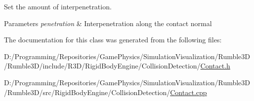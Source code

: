 Set the amount of interpenetration. 


\begin{DoxyParams}{Parameters}
{\em penetration} & Interpenetration along the contact normal \\
\hline
\end{DoxyParams}


The documentation for this class was generated from the following files\+:\begin{DoxyCompactItemize}
\item 
D\+:/\+Programming/\+Repositories/\+Game\+Physics/\+Simulation\+Visualization/\+Rumble3\+D/\+Rumble3\+D/include/\+R3\+D/\+Rigid\+Body\+Engine/\+Collision\+Detection/\mbox{\hyperlink{_contact_8h}{Contact.\+h}}\item 
D\+:/\+Programming/\+Repositories/\+Game\+Physics/\+Simulation\+Visualization/\+Rumble3\+D/\+Rumble3\+D/src/\+Rigid\+Body\+Engine/\+Collision\+Detection/\mbox{\hyperlink{_contact_8cpp}{Contact.\+cpp}}\end{DoxyCompactItemize}
